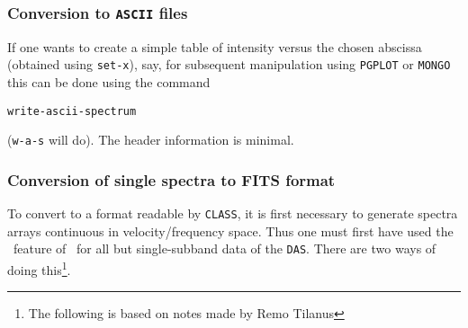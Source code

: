 \subsubsection{Conversion to {\tt ASCII} files}
\label{sec:specx2ascii}
If one wants to create a simple table of intensity versus the chosen
abscissa (obtained using {\tt set-x}), say, for subsequent
manipulation using {\tt PGPLOT} or {\tt MONGO} this can be done using
the command

\SP \verb|write-ascii-spectrum|

({\tt{w-a-s}} will do). The header information is minimal.

\subsubsection{Conversion of single spectra to FITS format}
\label{sec:specx2fits}
To convert to a format readable by {\tt CLASS}, it is first necessary
to generate spectra arrays continuous in velocity/frequency
space. Thus one must first have used the \dm\ feature of \SPECX\ for
all but single-subband data of the {\tt DAS}. There are two ways of
doing this\footnote{The following is based on notes made by Remo
Tilanus}.
